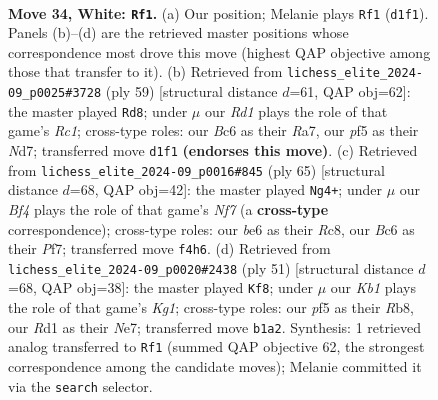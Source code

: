 \documentclass[11pt]{article}
\begin{document}
\clearpage

\begin{figure}[p]\centering
\begin{subfigure}{0.46\textwidth}\centering
\resizebox{\linewidth}{!}{%
\newchessgame
\chessboard[
  setfen={5r2/r7/p1B1bkp1/p4p1p/2n2B2/P4PP1/1P5P/RK1R2N1 w - - 4 34},
  showmover=false,
  pgfstyle=straightmove, color=movearrow, markmove={d1-f1}
]}
\caption{}
\end{subfigure}\hfill
\begin{subfigure}{0.46\textwidth}\centering
\resizebox{\linewidth}{!}{%
\newchessgame
\chessboard[
  setfen={2r3k1/rb1n2pp/2pPR3/1p6/p7/P1N2P2/1P4PP/3R1BK1 b - - 0 30},
  showmover=false,
  pgfstyle=straightmove, color=movearrow, markmove={c8-d8}
]}
\caption{}
\end{subfigure}
\\[4pt]
\begin{subfigure}{0.46\textwidth}\centering
\resizebox{\linewidth}{!}{%
\newchessgame
\chessboard[
  setfen={2r1r1k1/5pp1/4p2p/3pP2P/2bN4/R5P1/P1P2nBK/1R6 b - - 1 33},
  showmover=false,
  pgfstyle=straightmove, color=movearrow, markmove={f2-g4}
]}
\caption{}
\end{subfigure}\hfill
\begin{subfigure}{0.46\textwidth}\centering
\resizebox{\linewidth}{!}{%
\newchessgame
\chessboard[
  setfen={1r1r2k1/4n1pp/B4p2/RP1pp3/4b2P/2P1N3/5PP1/5RK1 b - - 0 26},
  showmover=false,
  pgfstyle=straightmove, color=movearrow, markmove={g8-f8}
]}
\caption{}
\end{subfigure}
\caption{\textbf{Move 34, White: \texttt{Rf1}.} (a) Our position; Melanie plays \texttt{Rf1} (\texttt{d1f1}). Panels (b)--(d) are the retrieved master positions whose correspondence most drove this move (highest QAP objective among those that transfer to it). (b) Retrieved from \texttt{lichess\_elite\_2024-09\_p0025\#3728} (ply 59) [structural distance $d$=61, QAP obj=62]: the master played \texttt{Rd8}; under $\mu$ our \emph{Rd1} plays the role of that game's \emph{Rc1}; cross-type roles: our \emph{B}c6 as their \emph{R}a7, our \emph{p}f5 as their \emph{N}d7; transferred move \texttt{d1f1} \textbf{(endorses this move)}. (c) Retrieved from \texttt{lichess\_elite\_2024-09\_p0016\#845} (ply 65) [structural distance $d$=68, QAP obj=42]: the master played \texttt{Ng4+}; under $\mu$ our \emph{Bf4} plays the role of that game's \emph{Nf7} (a \textbf{cross-type} correspondence); cross-type roles: our \emph{b}e6 as their \emph{R}c8, our \emph{B}c6 as their \emph{P}f7; transferred move \texttt{f4h6}. (d) Retrieved from \texttt{lichess\_elite\_2024-09\_p0020\#2438} (ply 51) [structural distance $d$=68, QAP obj=38]: the master played \texttt{Kf8}; under $\mu$ our \emph{Kb1} plays the role of that game's \emph{Kg1}; cross-type roles: our \emph{p}f5 as their \emph{R}b8, our \emph{R}d1 as their \emph{N}e7; transferred move \texttt{b1a2}. Synthesis: 1 retrieved analog transferred to \texttt{Rf1} (summed QAP objective 62, the strongest correspondence among the candidate moves); Melanie committed it via the \texttt{search} selector.}
\label{fig:thought-m66}
\end{figure}
\end{document}
